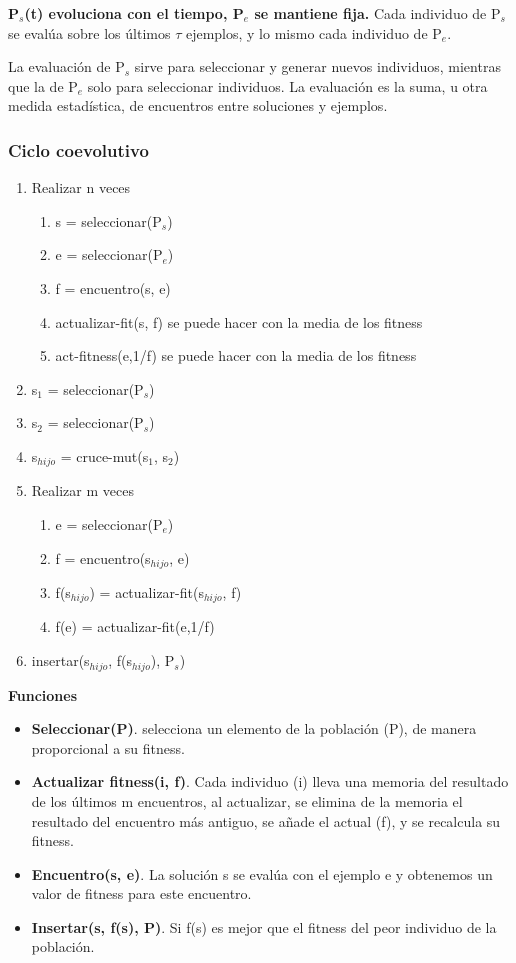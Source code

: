 \documentclass[12pt, twoside, openright]{report} %
\begin{document}
\textbf{P$_s$(t) evoluciona con el tiempo, P$_e$ se mantiene fija.} Cada individuo de P$_s$ se evalúa sobre los últimos $\tau$ ejemplos, y lo mismo cada individuo de P$_e$.

La evaluación de P$_s$ sirve para seleccionar y generar nuevos individuos, mientras que la de P$_e$ solo para seleccionar individuos. La evaluación es la suma, u otra medida estadística, de encuentros entre soluciones y ejemplos.

\subsubsection{Ciclo coevolutivo}
\begin{enumerate}
	\item Realizar n veces
	\begin{enumerate}
		\item s = seleccionar(P$_s$)
		\item e = seleccionar(P$_e$)
		\item f = encuentro(s, e)
		\item actualizar-fit(s, f) se puede hacer con la media de los fitness
		\item act-fitness(e,1/f) se puede hacer con la media de los fitness
	\end{enumerate}
	\item s$_1$ = seleccionar(P$_s$)
	\item s$_2$ = seleccionar(P$_s$)
	\item s$_{hijo}$ = cruce-mut(s$_1$, s$_2$)
	\item Realizar m veces
	\begin{enumerate}
		\item e = seleccionar(P$_e$)
		\item f = encuentro(s$_{hijo}$, e)
		\item f(s$_{hijo}$) = actualizar-fit(s$_{hijo}$, f)
		\item f(e) = actualizar-fit(e,1/f)
	\end{enumerate}
	\item insertar(s$_{hijo}$, f(s$_{hijo}$), P$_s$)
\end{enumerate}

\textbf{Funciones}
\begin{itemize}
	\item \textbf{Seleccionar(P)}. selecciona un elemento de la población (P), de manera proporcional a su fitness.
	\item \textbf{Actualizar fitness(i, f)}. Cada individuo (i) lleva una memoria del resultado de los últimos m encuentros, al actualizar, se elimina de la memoria el resultado del encuentro más antiguo, se añade el actual (f), y se recalcula su fitness.
	\item \textbf{Encuentro(s, e)}. La solución s se evalúa con el ejemplo e y obtenemos un valor de fitness para este encuentro.
	\item \textbf{Insertar(s, f(s), P)}. Si f(s) es mejor que el fitness del peor individuo de la población.
\end{itemize}
\end{document}
